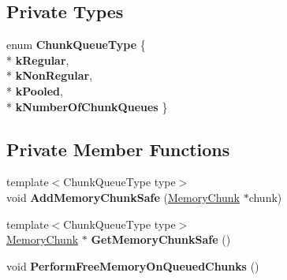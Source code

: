 \subsection*{Private Types}
\begin{DoxyCompactItemize}
\item 
enum {\bfseries Chunk\+Queue\+Type} \{ \\*
{\bfseries k\+Regular}, 
\\*
{\bfseries k\+Non\+Regular}, 
\\*
{\bfseries k\+Pooled}, 
\\*
{\bfseries k\+Number\+Of\+Chunk\+Queues}
 \}\hypertarget{classv8_1_1internal_1_1_memory_allocator_1_1_unmapper_afd64e4ca0976675e5215ae8e5da88cdf}{}\label{classv8_1_1internal_1_1_memory_allocator_1_1_unmapper_afd64e4ca0976675e5215ae8e5da88cdf}

\end{DoxyCompactItemize}
\subsection*{Private Member Functions}
\begin{DoxyCompactItemize}
\item 
{\footnotesize template$<$Chunk\+Queue\+Type type$>$ }\\void {\bfseries Add\+Memory\+Chunk\+Safe} (\hyperlink{classv8_1_1internal_1_1_memory_chunk}{Memory\+Chunk} $\ast$chunk)\hypertarget{classv8_1_1internal_1_1_memory_allocator_1_1_unmapper_a2d42b92c85978530a383a3950cba3514}{}\label{classv8_1_1internal_1_1_memory_allocator_1_1_unmapper_a2d42b92c85978530a383a3950cba3514}

\item 
{\footnotesize template$<$Chunk\+Queue\+Type type$>$ }\\\hyperlink{classv8_1_1internal_1_1_memory_chunk}{Memory\+Chunk} $\ast$ {\bfseries Get\+Memory\+Chunk\+Safe} ()\hypertarget{classv8_1_1internal_1_1_memory_allocator_1_1_unmapper_a23294b625723d124e55973b5c47492c5}{}\label{classv8_1_1internal_1_1_memory_allocator_1_1_unmapper_a23294b625723d124e55973b5c47492c5}

\item 
void {\bfseries Perform\+Free\+Memory\+On\+Queued\+Chunks} ()\hypertarget{classv8_1_1internal_1_1_memory_allocator_1_1_unmapper_a21c48075a2b4ef639932e09590caf509}{}\label{classv8_1_1internal_1_1_memory_allocator_1_1_unmapper_a21c48075a2b4ef639932e09590caf509}

\end{DoxyCompactItemize}
